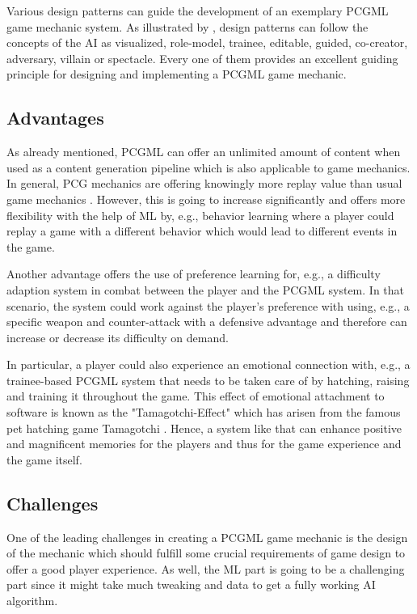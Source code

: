 \documentclass[MGS,Master,english]{twbook}%
\begin{document}
Various design patterns can guide the development of an exemplary \ac{PCGML} game mechanic system. As illustrated by \citep{ai::aiBasedGameDesignPattern}, design patterns can follow the concepts of the \ac{AI} as visualized, role-model, trainee, editable, guided, co-creator, adversary, villain or spectacle. Every one of them provides an excellent guiding principle for designing and implementing a \ac{PCGML} game mechanic.

\subsection{Advantages}
As already mentioned, \ac{PCGML} can offer an unlimited amount of content when used as a content generation pipeline which is also applicable to game mechanics. In general, \ac{PCG} mechanics are offering knowingly more replay value than usual game mechanics \cite{pcg::book}. However, this is going to increase significantly and offers more flexibility with the help of \ac{ML} by, e.g., behavior learning where a player could replay a game with a different behavior which would lead to different events in the game.

Another advantage offers the use of preference learning for, e.g., a difficulty adaption system in combat between the player and the \ac{PCGML} system. In that scenario, the system could work against the player’s preference with using, e.g., a specific weapon and counter-attack with a defensive advantage and therefore can increase or decrease its difficulty on demand.

In particular, a player could also experience an emotional connection with, e.g., a trainee-based \ac{PCGML} system that needs to be taken care of by hatching, raising and training it throughout the game. This effect of emotional attachment to software is known as the "Tamagotchi-Effect" which has arisen from the famous pet hatching game Tamagotchi \cite{intro::tamagotchiEffect}. Hence, a system like that can enhance positive and magnificent memories for the players and thus for the game experience and the game itself.

\subsection{Challenges}
One of the leading challenges in creating a \ac{PCGML} game mechanic is the design of the mechanic which should fulfill some crucial requirements of game design to offer a good player experience. As well, the \ac{ML} part is going to be a challenging part since it might take much tweaking and data to get a fully working \ac{AI} algorithm.
\end{document}
